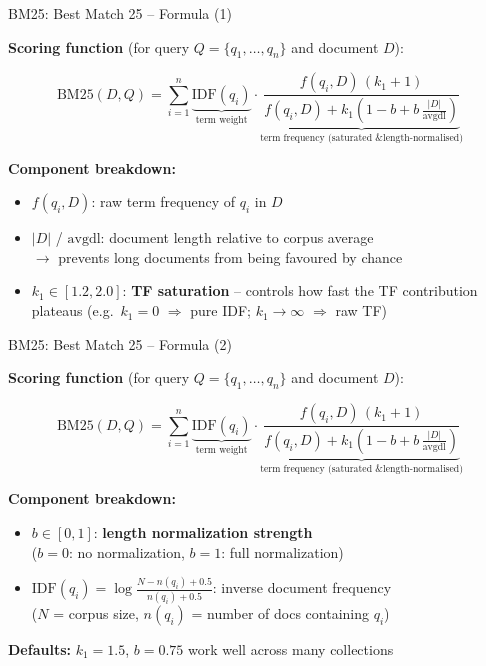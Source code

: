 \documentclass[11pt,compress,t,notes=noshow, xcolor=table]{beamer}
\begin{document}
\begin{frame}{BM25: Best Match 25 -- Formula (1)}

\vspace{1em}

\textbf{Scoring function} (for query $Q = \{q_1,\dots,q_n\}$ and document $D$):

\[
\text{BM25}(D,Q) = \sum_{i=1}^{n} \underbrace{\text{IDF}(q_i)}_{\text{term weight}} \cdot \underbrace{\frac{f(q_i,D)\,(k_1+1)}{f(q_i,D) + k_1\!\left(1-b+b\,\tfrac{|D|}{\text{avgdl}}\right)}}_{\text{term frequency (saturated \& length-normalised)}}
\]

\vspace{0.5em}

\textbf{Component breakdown:}
\begin{itemize}
    \item $f(q_i,D)$: raw term frequency of $q_i$ in $D$
    \item $|D|$ / $\text{avgdl}$: document length relative to corpus average\\
          $\rightarrow$ prevents long documents from being favoured by chance
    \item $k_1 \in [1.2, 2.0]$: \textbf{TF saturation} -- controls how fast the TF contribution plateaus (e.g.\ $k_1{=}0$ $\Rightarrow$ pure IDF; $k_1{\to}\infty$ $\Rightarrow$ raw TF)
\end{itemize}

\vfill

\end{frame}


\begin{frame}{BM25: Best Match 25 -- Formula (2)}

\vspace{1em}

\textbf{Scoring function} (for query $Q = \{q_1,\dots,q_n\}$ and document $D$):

\[
\text{BM25}(D,Q) = \sum_{i=1}^{n} \underbrace{\text{IDF}(q_i)}_{\text{term weight}} \cdot \underbrace{\frac{f(q_i,D)\,(k_1+1)}{f(q_i,D) + k_1\!\left(1-b+b\,\tfrac{|D|}{\text{avgdl}}\right)}}_{\text{term frequency (saturated \& length-normalised)}}
\]

\vspace{0.5em}

\textbf{Component breakdown:}
\begin{itemize}
    \item $b \in [0,1]$: \textbf{length normalization strength}\\
          ($b{=}0$: no normalization, $b{=}1$: full normalization)
    \item $\text{IDF}(q_i) = \log\!\frac{N - n(q_i) + 0.5}{n(q_i) + 0.5}$: inverse document frequency\\
          ($N$ = corpus size, $n(q_i)$ = number of docs containing $q_i$)
\end{itemize}

\vfill

\textbf{Defaults:} $k_1 = 1.5$, $b = 0.75$ work well across many collections

\end{frame}
\end{document}
